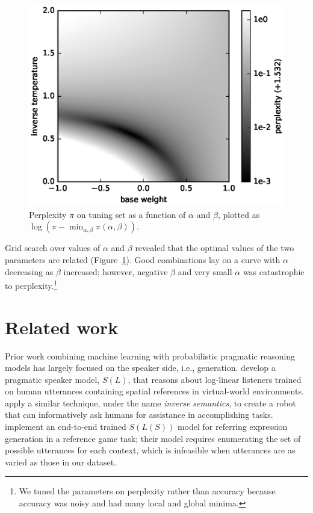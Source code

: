 \documentclass[11pt,letterpaper]{article}
\newcommand{\term}{\textit}
\newcommand{\Listener}{L}
\newcommand{\Speaker}{S}
\renewcommand{\|}{\mid}
\newcommand{\figref}[1]{Figure~\ref{#1}}
\begin{document}
\begin{figure}
\centering
\includegraphics[width=\columnwidth]{figures/alpha_beta.eps}
\caption{Perplexity $\pi$ on tuning set as a function of $\alpha$ and $\beta$, plotted as $\log(\pi - \min_{\alpha,\beta} \pi(\alpha, \beta))$.}
\label{fig:alpha_beta}
\end{figure}

Grid search over values of $\alpha$ and $\beta$ revealed that the optimal values of 
the two parameters are related (\figref{fig:alpha_beta}). Good combinations lay on
a curve with $\alpha$ decreasing as $\beta$ increased; however, negative $\beta$ and
very small $\alpha$ was catastrophic to perplexity.\footnote{We tuned the
parameters on perplexity rather than accuracy because accuracy was noisy and had
many local and global minima.}

\section{Related work}

Prior work combining machine learning with probabilistic pragmatic reasoning
models has largely focused on the speaker side, i.e., generation.
 develop a pragmatic speaker model,
$\Speaker(\Listener)$, that reasons about log-linear listeners trained on human
utterances containing spatial references in virtual-world environments.
 apply a similar technique, under the name
\term{inverse semantics}, to create a robot that can informatively ask
humans for assistance in accomplishing tasks.  implement
an end-to-end trained $\Speaker(\Listener(\Speaker))$ model for referring
expression generation in a reference game task; their model requires enumerating
the set of possible utterances for each context, which is infeasible when
utterances are as varied as those in our dataset.
\end{document}
